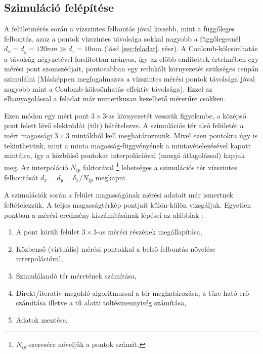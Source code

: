 	

\subsection{Szimuláció felépítése} \label{sec:felepites}
	
	A felületmérés során a vízszintes felbontás jóval kissebb, mint a függőleges felbontás, azaz a
	pontok vízszintes távolsága sokkal nagyobb a függőlegesnél $d_x=d_y=120nm \gg d_z=10nm$ (lásd
	\ref{sec:feladat}. rész).
	A Coulomb-kölcsönhatás a távolság négyzetével fordítottan arányos, így az előbb említettek értelmében egy mérési pont szomszédjait, pontosabban egy redukált
	környezetét szükséges csupán szimulálni (Másképpen megfogalmazva a vízszintes mérési pontok
	távolsága jóval nagyobb mint a Coulomb-kölcsönhatás effektív távolsága). Ezzel az elhanyagolással
	a feladat már numerikusan kezelhető méretűre csökken.
	
	Ezen módon egy mért pont $3\times3$-as környezetét vesszük figyelembe,
	a középső pont felett lévő elektródát (tűt) feltételezve.
	A szimulációs tér alsó felületét a mért magassági $3\times 3$ mintákból kell meghatároznunk.
	Mivel ezen pontokra úgy is tekinthetünk, mint a minta magasság-függvényének a mintavételezésével
	kapott mintáira, így a közbülső pontokat interpolációval (mozgó átlagolással) kapjuk meg.
	Az interpoláció $N_{ip}$ faktorával \footnote{$N_{ip}$-szeresére növeljük a pontok számát.}
	lehetséges a szimulációs tér vízszintes felbontását $d_x=d_y = \delta_x / N_{ip}$ megkapni.

	A szimulációk során a felület magasságának mérési adatait már ismertnek feltételezzük.
	A teljes magasságtérkép pontjait külön-külön vizsgáljuk.
	Egyetlen pontban a mérési eredmény kiszámításának lépései az alábbiak :
	
	\begin{enumerate}
		\item A pont körüli felület $3\times3$-as mérési részének megállapítása,
		\item Közbenső (virtuális) mérési pontokkal a belső felbontás növelése
		interpolációval,
		\item Szimulálandó tér méretének számítása,
		\item Direkt/iteratív megoldó algoritmussal a tér meghatározása, 
				a tűre ható erő számítása illetve a tű alatti töltésmennyiség számítása,
		\item Adatok mentése.
	\end{enumerate}
	

	